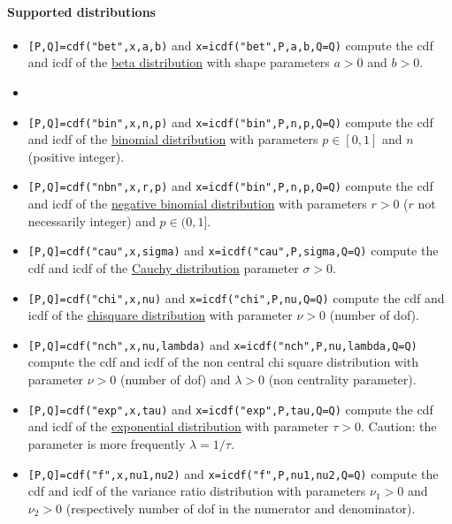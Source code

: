\begin{mandescription}
\paragraph{Supported distributions}
\begin{itemize}

\item {}  
\verb![P,Q]=cdf("bet",x,a,b)! and \verb!x=icdf("bet",P,a,b,Q=Q)! compute the
  cdf and icdf of the \hyperlink{betapdf}{beta distribution} with shape parameters $a > 0$ and $b > 0$.
 
\item {}
\item \verb![P,Q]=cdf("bin",x,n,p)! and \verb!x=icdf("bin",P,n,p,Q=Q)! compute the cdf and icdf
  of the  \hyperlink{binpdf}{binomial distribution} with parameters $p \in [0,1]$ and $n$
  (positive integer). 

\item {} \verb![P,Q]=cdf("nbn",x,r,p)! and \verb!x=icdf("bin",P,n,p,Q=Q)! compute
  the cdf and icdf of the \hyperlink{nbnpdf}{negative binomial distribution} with parameters $r > 0$ ($r$ not
  necessarily integer) and $p \in (0,1]$. 


\item {} \verb![P,Q]=cdf("cau",x,sigma)! and  \verb!x=icdf("cau",P,sigma,Q=Q)! compute the 
  cdf and icdf of the  \hyperlink{caupdf}{Cauchy distribution} parameter $\sigma > 0$.

\item {} \verb![P,Q]=cdf("chi",x,nu)! and  \verb!x=icdf("chi",P,nu,Q=Q)! compute the
cdf and icdf of the \hyperlink{chipdf}{chisquare distribution} with parameter $\nu > 0$ (number of dof).

\item {} \verb![P,Q]=cdf("nch",x,nu,lambda)! and  \verb!x=icdf("nch",P,nu,lambda,Q=Q)! compute the
cdf and icdf of the non central chi square distribution %
with parameter $\nu > 0$ (number of dof) and  $\lambda > 0$ (non centrality parameter).

\item {} \verb![P,Q]=cdf("exp",x,tau)! and \verb!x=icdf("exp",P,tau,Q=Q)! compute the cdf
and icdf of the  \hyperlink{exppdf}{exponential distribution} with parameter $\tau > 0$.
Caution: the parameter is more frequently $\lambda = 1/\tau$.

\item {} \verb![P,Q]=cdf("f",x,nu1,nu2)! and \verb!x=icdf("f",P,nu1,nu2,Q=Q)! compute
the cdf and icdf of the variance ratio distribution with parameters $\nu_1 > 0$ and $\nu_2 >
  0$ (respectively number of dof in the numerator and denominator). 


\end{itemize}
\end{mandescription}

